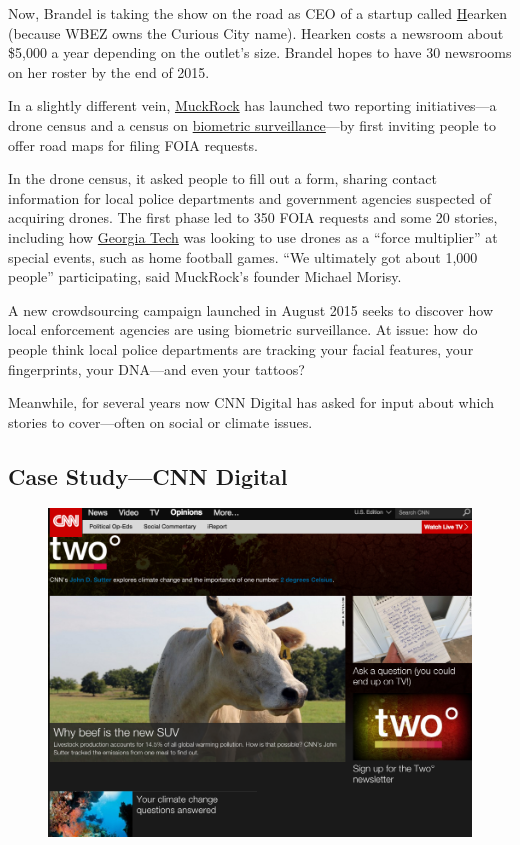 \documentclass[notoc, symmetric, nobib, nols]{towcenter-guideto-book}
\begin{document}
Now, Brandel is taking the show on the road as CEO of a startup called \href{http://www.wearehearken.com/}Hearken\autocite{Hearken} (because WBEZ owns the Curious City name). Hearken costs a newsroom about \$5,000 a year depending on the outlet's size. Brandel hopes to have 30 newsrooms on her roster by the end of 2015.

In a slightly different vein, \href{https://www.muckrock.com/}{MuckRock} has launched two reporting initiatives---a drone census and a census on \href{https://www.muckrock.com/news/archives/2015/aug/04/street-level-surveillance-who-using-mobile-biometr/}{biometric surveillance}---by first inviting people to offer road maps for filing FOIA requests.%

In the drone census, it asked people to fill out a form, sharing contact information for local police departments and government agencies suspected of acquiring drones. The first phase led to 350 FOIA requests and some 20 stories, including how \href{https://www.muckrock.com/news/archives/2013/jan/24/georgia-tech-police-wanted-fly-surveillance-drone-/}{Georgia Tech}\autocite{Drone}
was looking to use drones as a ``force multiplier'' at special events, such as home football games. ``We ultimately got about 1,000 people'' participating, said MuckRock's founder Michael Morisy.%

A new crowdsourcing campaign launched in August 2015 seeks to discover how local enforcement agencies are using biometric surveillance.\autocite{surveillance} At issue: how do people think local police departments are tracking your facial features, your fingerprints, your DNA---and even your tattoos?%

Meanwhile, for several years now CNN Digital has asked for input about which stories to cover---often on social or climate issues.

\subsection{Case Study---CNN Digital} 

\begin{figure}
\includegraphics{graphics/CNN.png}
\end{figure}
\end{document}
